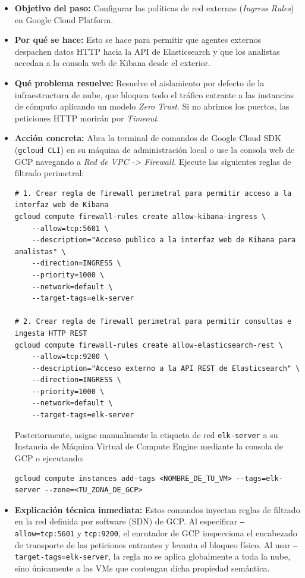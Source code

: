 \documentclass[
  coursetitle={Cómputo Nube y Tecnologías Emergentes},
  coursehours={96},
  coursedate={Verano 2026},
  doctype={Práctica},
  otherlangs={english,french},
  authorname={Lázaro},
  authorsurname={Bustio-Martínez},
  authortitle={PhD},
  role={Profesor Investigador},
  email={lbustio@inaoe.mx},
  phone={5559504000},
  ext={7459},
  institution={Instituto Nacional de Astrofísica, Óptica y Electrónica (INAOE)},
  department={Maestría en Ciencias en Tecnologías de Seguridad},
  address={Luis Enrique Erro 1, Sta. Ma. Tonantzintla, San Andrés Cholula, CP 72840, Puebla, México},
  margin={0.5in}
]{../../lbustio_lecture_notes}
\begin{document}
\begin{itemize}
    \item \textbf{Objetivo del paso:} Configurar las políticas de red externas (\textit{Ingress Rules}) en Google Cloud Platform.
    \item \textbf{Por qué se hace:} Esto se hace para permitir que agentes externos despachen datos HTTP hacia la API de Elasticsearch y que los analistas accedan a la consola web de Kibana desde el exterior.
    \item \textbf{Qué problema resuelve:} Resuelve el aislamiento por defecto de la infraestructura de nube, que bloquea todo el tráfico entrante a las instancias de cómputo aplicando un modelo \textit{Zero Trust}. Si no abrimos los puertos, las peticiones HTTP morirán por \textit{Timeout}.
    \item \textbf{Acción concreta:} Abra la terminal de comandos de Google Cloud SDK (\texttt{gcloud CLI}) en su máquina de administración local o use la consola web de GCP navegando a \textit{Red de VPC -> Firewall}. Ejecute las siguientes reglas de filtrado perimetral:
    
\begin{verbatim}
# 1. Crear regla de firewall perimetral para permitir acceso a la interfaz web de Kibana
gcloud compute firewall-rules create allow-kibana-ingress \
    --allow=tcp:5601 \
    --description="Acceso publico a la interfaz web de Kibana para analistas" \
    --direction=INGRESS \
    --priority=1000 \
    --network=default \
    --target-tags=elk-server

# 2. Crear regla de firewall perimetral para permitir consultas e ingesta HTTP REST
gcloud compute firewall-rules create allow-elasticsearch-rest \
    --allow=tcp:9200 \
    --description="Acceso externo a la API REST de Elasticsearch" \
    --direction=INGRESS \
    --priority=1000 \
    --network=default \
    --target-tags=elk-server
\end{verbatim}

    Posteriormente, asigne manualmente la etiqueta de red \texttt{elk-server} a su Instancia de Máquina Virtual de Compute Engine mediante la consola de GCP o ejecutando:
    
\begin{verbatim}
gcloud compute instances add-tags <NOMBRE_DE_TU_VM> --tags=elk-server --zone=<TU_ZONA_DE_GCP>
\end{verbatim}

    \item \textbf{Explicación técnica inmediata:} Estos comandos inyectan reglas de filtrado en la red definida por software (SDN) de GCP. Al especificar \texttt{--allow=tcp:5601} y \texttt{tcp:9200}, el enrutador de GCP inspecciona el encabezado de transporte de las peticiones entrantes y levanta el bloqueo físico. Al usar \texttt{--target-tags=elk-server}, la regla no se aplica globalmente a toda la nube, sino únicamente a las VMs que contengan dicha propiedad semántica.
    

\end{itemize}
\end{document}

